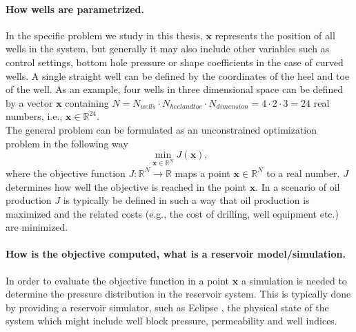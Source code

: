 \paragraph{How wells are parametrized.}
%
In the specific problem we study in this thesis,
$\textbf{x}$ represents the position of all wells
in the system, but generally 
it may also include other variables such as control
settings, bottom hole pressure or shape coefficients
in the case of curved wells.
%
A single straight well can be defined by the
coordinates of the heel and toe of the well.
%
As an example, four wells in three dimensional space
can be defined by a vector $\textbf{x}$ containing
%
$ N= N_{wells} \cdot N_{heel and toe} \cdot N_{dimension} = 4 \cdot 2 \cdot 3 =  24$
% 
real numbers, i.e., $\textbf{x} \in \mathbb{R}^{24}.$ \\
%
The general problem can be formulated as an unconstrained
optimization problem in the following way
%
\begin{equation}
\min_{\textbf{x} \in \mathbb{R}^N} J \left( \textbf{x} \right),
\label{introProb}
\end{equation}
%
where the objective function 
%
$J:\mathbb{R}^N \rightarrow \mathbb{R}$ 
%
maps a point
%
$\textbf{x} \in \mathbb{R}^N$ to a real number.
%
$J$ determines how well the objective is reached
in the point $\textbf{x}$. In a scenario of oil
production $J$ is typically be defined in such a 
way that oil production is maximized and the related costs
(e.g., the cost of drilling, well equipment etc.)
are minimized. 
%
%
\paragraph{How is the objective computed, what is a
reservoir model/simulation.}
%
In order to evaluate the objective function in a point
$\textbf{x}$ a simulation is needed to determine the 
pressure distribution in the reservoir system. 
% 
This is typically done by providing a reservoir simulator, 
such as Eclipse \cite{Eclipse}, the physical state of 
the system which might include well block pressure,
permeability and well indices.
%
